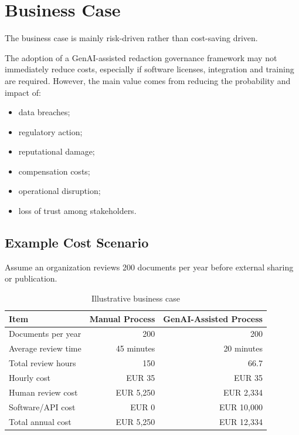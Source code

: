\documentclass[12pt,a4paper]{article}
\begin{document}
\section{Business Case}

The business case is mainly risk-driven rather than cost-saving driven.

The adoption of a GenAI-assisted redaction governance framework may not immediately reduce costs, especially if software licenses, integration and training are required. However, the main value comes from reducing the probability and impact of:

\begin{itemize}
    \item data breaches;
    \item regulatory action;
    \item reputational damage;
    \item compensation costs;
    \item operational disruption;
    \item loss of trust among stakeholders.
\end{itemize}

\subsection{Example Cost Scenario}

Assume an organization reviews 200 documents per year before external sharing or publication.

\begin{table}[h!]
\centering
{}
\begin{tabular}{@{} l r r @{}}
\toprule
\textbf{\color{accentdark}Item} & \textbf{\color{accentdark}Manual Process} & \textbf{\color{accentdark}GenAI-Assisted Process} \\
\midrule
Documents per year & 200 & 200 \\
Average review time & 45 minutes & 20 minutes \\
Total review hours & 150 & 66.7 \\
Hourly cost & EUR 35 & EUR 35 \\
Human review cost & EUR 5,250 & EUR 2,334 \\
Software/API cost & EUR 0 & EUR 10,000 \\
Total annual cost & EUR 5,250 & EUR 12,334 \\
\bottomrule
\end{tabular}
\caption{Illustrative business case}
\end{table}
\end{document}
